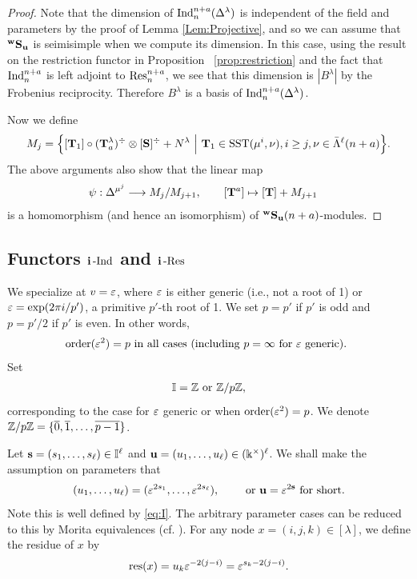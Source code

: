 \begin{proof}
Note that the dimension of $\operatorname{Ind}\nolimits^{n+a}_{n} (\Delta^\lambda) $ is independent of the field and parameters by the proof of  Lemma \ref{Lem:Projective}, and so we can assume that ${}^{\bold{w}}\bold{S}_{\mathbf{u}}$ is seimisimple when we compute its dimension. In this case, using the result on the restriction functor in Proposition~ \ref{prop:restriction} and the fact that $\operatorname{Ind}\nolimits_n^{n+a}$ is left adjoint to  
$ \operatorname{Res}\nolimits_n^{n+a}$, we see that this dimension is $|B^\lambda|$ by the Frobenius reciprocity. Therefore $B^\lambda $ is a basis of $\operatorname{Ind}\nolimits^{n+a}_{n} (\Delta^\lambda)$.

Now we define 
\[
M_j= \Big\{[\mathbf{T}_1]\circ (\mathbf{T}_a^{\lambda})^\div \otimes [\mathbf{S}]^\div  +N^\lambda ~\Big |~\mathbf{T}_1\in \text{SST}(\mu^i,\nu), i\ge j , \nu \in \bar\Lambda^{\ell}(n+a) \Big\}.
\]
The above arguments also show that  the linear map 
    \begin{align*}
        \psi : \Delta^{\mu^j}&\longrightarrow M_j/M_{j+1}, \qquad
      [\mathbf{T}^a] \mapsto  [\mathbf{T}] + M_{j+1}
    \end{align*}
    is a homomorphism (and hence an isomorphism) of ${}^{\bold{w}}\bold{S}_{\mathbf{u}}(n+a)$-modules.
\end{proof}

\subsection{Functors $\mathbf{i}\operatorname{-Ind}\nolimits$ and $\mathbf{i}\operatorname{-Res}\nolimits$}

We specialize at $v=\varepsilon$, where $\varepsilon$ is either generic (i.e., not a root of 1) or $\varepsilon=\exp(2\pi i/p')$, a primitive $p'$-th root of 1. We set $p=p'$ if $p'$ is odd and $p=p'/2$ if $p'$ is even. In other words, 
\begin{align}
    \text{$\text{order}(\varepsilon^2)=p$   in all cases (including $p=\infty$ for $\varepsilon$ generic). }
\end{align}
Set 
\begin{align} \label{eq:I}
\mathbb{I} =\mathbb{Z} \text{ or } \mathbb{Z}/p\mathbb{Z}, 
    \end{align}
corresponding to the case for $\varepsilon$ generic or when $\text{order}(\varepsilon^2)=p$. We denote $\mathbb{Z}/p\mathbb{Z} =\{\overline{0}, \overline{1}, \ldots, \overline{p-1}\}$. 

Let $\mathbf{s} =(s_1, \ldots, s_\ell) \in \mathbb{I}^\ell$ and $\mathbf{u} =(u_1,\ldots, u_\ell) \in (\Bbbk^\times)^\ell$. We shall make the assumption on parameters that 
\begin{align} \label{u:parameter}
(u_1,\ldots, u_\ell)= (\varepsilon^{2s_1}, \ldots, \varepsilon^{2s_\ell}), \qquad \text{ or } \mathbf{u} =\varepsilon^{2\mathbf{s}} \text{ for short}. 
\end{align}
Note this is well defined by \eqref{eq:I}. The arbitrary parameter cases can be reduced to this by Morita equivalences (cf. \cite{DM02}). 
For any node $x=(i,j,k)\in [\lambda]$, we define the residue of $x$ by 
\[
\operatorname{res}\nolimits(x)=u_k\varepsilon^{-2(j-i)} = \varepsilon^{s_k-2(j-i)}
.\]

